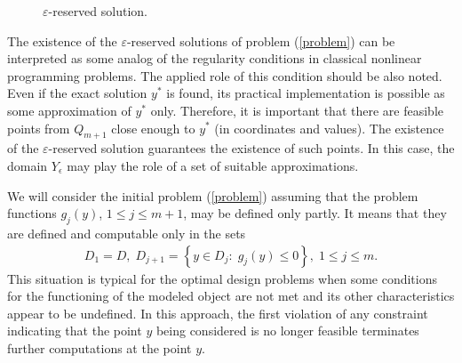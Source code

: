 \documentclass[twocolumn]{svjour3}          %
\begin{document}
\begin{figure}
	\caption{$\varepsilon$-reserved solution.}
	\label{fig:eps_reserved_solution}
\end{figure}

	The existence of the $\varepsilon$-reserved solutions of problem (\ref{problem}) can be interpreted as some analog of the regularity conditions in classical nonlinear programming problems. The applied role of this condition should be also noted. Even if the exact solution $y^\ast$ is found, its practical implementation is possible as some approximation of $y^\ast$ only. Therefore, it is important that there are feasible points from $Q_{m+1}$ close enough to $y^\ast$ (in coordinates and values). The existence of the $\varepsilon$-reserved solution guarantees the existence of such points. In this case, the domain $Y_{\epsilon}$ may play the role of a set of suitable approximations.

	We will consider the initial problem (\ref{problem}) assuming that the problem functions $g_{j}(y)$, $1 \leq j \leq m+1$, may be defined only partly. It means that they are defined and computable only in the sets
\small
\begin{align}\label{D_sets}
	D_1 = D, \; D_{j+1} = \left\{ y \in D_j: \; g_j(y) \leq 0 \right\}, \; 1 \leq j \leq m.
\end{align}
\normalsize
This situation is typical for the optimal design problems when some conditions for the functioning of the modeled object are not met and its other characteristics appear to be undefined. In this approach, the first violation of any constraint indicating that the point $y$ being considered is no longer feasible terminates further computations at the point $y$.
\end{document}
